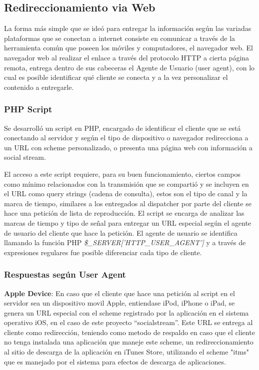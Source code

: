 	\subsection{Redireccionamiento via Web}
La forma más simple que se ideó para entregar la información según las variadas plataformas que se conectan a internet consiste en comunicar a través de la herramienta común que poseen los móviles y computadores, el navegador web.
El navegador web al realizar el enlace a través del protocolo HTTP a cierta página remota, entrega dentro de sus cabeceras el Agente de Usuario (user agent), con lo cual es posible identificar qué cliente se conecta y a la vez personalizar el contenido a entregarle.

		\subsubsection{PHP Script}
Se desarrolló un script en PHP, encargado de identificar el cliente que se está conectando al servidor y según el tipo de dispositivo o navegador redirecciona a un URL con scheme personalizado, o presenta una página web con información a social stream.

El acceso a este script requiere, para su buen funcionamiento, ciertos campos como mínimo relacionados con la transmisión que se compartió y se incluyen en el URL como query strings (cadena de consulta), estos son el tipo de canal y la marca de tiempo, similares a los entregados al dispatcher por parte del cliente se hace una petición de lista de reproducción.
El script se encarga de analizar las marcas de tiempo y tipo de señal para entregar un URL especial según el agente de usuario del cliente que hace la petición.
El agente de usuario se identifica llamando la función PHP \textit{\$\_SERVER['HTTP\_USER\_AGENT']} y a través de expresiones regulares fue posible diferenciar cada tipo de cliente.

		\subsubsection{Respuestas según User Agent}
\textbf{Apple Device}: En caso que el cliente que hace una petición al script en el servidor sea un dispositivo movil Apple, entiendase iPod, iPhone o iPad, se genera un URL especial con el scheme registrado por la aplicación en el sistema operativo iOS, en el caso de este proyecto \textquotedblleft socialstream\textquotedblright . Este URL se entrega al cliente como redirección, teniendo como metodo de respaldo en caso que el cliente no tenga instalada una aplicación que maneje este scheme, un redireccionamiento al sitio de descarga de la aplicación en iTunes Store, utilizando el scheme "itms" que es manejado por el sistema para efectos de descarga de aplicaciones. \\ 


